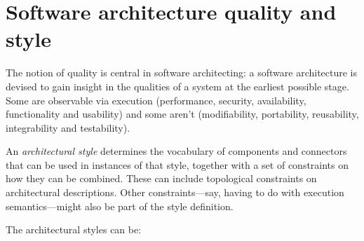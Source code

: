 \documentclass[12pt, a4paper]{report}
\newtheorem[style=M,bodystyle=\normalfont]{theorem}{Theorem}
\newtheorem[style=M,bodystyle=\normalfont]{corollary}{Corollary}
\newtheorem[style=M,bodystyle=\normalfont]{lemma}{Lemma}
\newtheorem[style=M,bodystyle=\normalfont]{definition}{Definition}
\begin{document}
\section{Software architecture quality and style}
    The notion of quality is central in software architecting: a software architecture is devised to gain insight in the qualities of a system at the earliest possible stage. Some are observable via execution (performance, security, availability, functionality and usability) and some aren't (modifiability, portability, reusability, integrability and testability). 
    \begin{definition}
        An \emph{architectural style} determines the vocabulary of components and connectors that can be used in instances of that style, together with a set of constraints on how they can be combined. These can include topological constraints on architectural descriptions. Other constraints—say, having to do with execution semantics—might also be part of the style definition.
    \end{definition}
    The architectural styles can be: 
\end{document}
